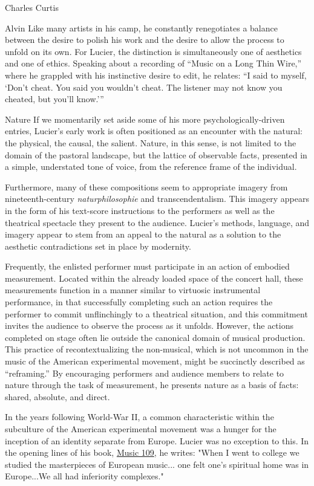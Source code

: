 \documentclass[a4paper,10pt]{report}
\numberwithin{equation}{section}
\begin{document}
\begin{chapter}{Charles Curtis}
\begin{section}{Alvin}
Like many artists in his camp, he constantly renegotiates a balance between the desire to polish his work and the desire to allow the process to unfold on its own. For Lucier, the distinction is simultaneously one of aesthetics and one of ethics. Speaking about a recording of ``Music on a Long Thin Wire,'' where he grappled with his instinctive desire to edit, he relates: ``I said to myself, `Don't cheat. You said you wouldn't cheat. The listener may not know you cheated, but you'll know.'''\cite[p.~530]{lucier1995} 
\end{section}
\begin{section}{Nature}
If we momentarily set aside some of his more psychologically-driven entries, Lucier's early work is often positioned as an encounter with the natural: the physical, the causal, the salient. Nature, in this sense, is not limited to the domain of the pastoral landscape, but the lattice of observable facts, presented in a simple, understated tone of voice, from the reference frame of the individual. 

Furthermore, many of these compositions seem to appropriate imagery from nineteenth-century \emph{naturphilosophie} and transcendentalism. This imagery appears in the form of his text-score instructions to the performers as well as the theatrical spectacle they present to the audience. Lucier's methods, language, and imagery appear to stem from an appeal to the natural as a solution to the aesthetic contradictions set in place by modernity. 

Frequently, the enlisted performer must participate in an action of embodied measurement. Located within the already loaded space of the concert hall, these measurements function in a manner similar to virtuosic instrumental performance, in that successfully completing such an action requires the performer to commit unflinchingly to a theatrical situation, and this commitment invites the audience to observe the process as it unfolds. However, the actions completed on stage often lie outside the canonical domain of musical production. This practice of recontextualizing the non-musical, which is not uncommon in the music of the American experimental movement, might be succinctly described as “reframing.”\cite{dewar2012} By encouraging performers and audience members to relate to nature through the task of measurement, he presents nature as a basis of facts: shared, absolute, and direct. 

In the years following World-War II, a common characteristic within the subculture of the American experimental movement was a hunger for the inception of an identity separate from Europe. Lucier was no exception to this. In the opening lines of his book, \underline{Music 109}, he writes: "When I went to college we studied the masterpieces of European music... one felt one's spiritual home was in Europe...We all had inferiority complexes." \cite[p.~1]{lucier2012}


\end{section}
\end{chapter}
\end{document}

